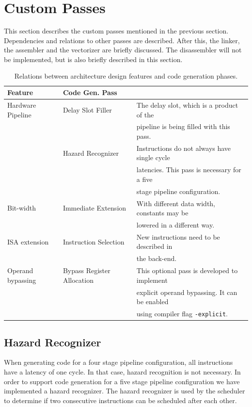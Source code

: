 \section{Custom Passes}
This section describes the custom passes mentioned in the previous section. Dependencies and relations to other passes are described. After this, the linker, the assembler and the vectorizer are briefly discussed. The disassembler will not be implemented, but is also briefly described in this section.

\begin{table}[t!]
\caption{Relations between architecture design features and code generation phases.}
\begin{center}
\begin{tabular}{@{}l l l@{}}
\toprule
\textbf{Feature} & \textbf{Code Gen. Pass} \\ \hline
Hardware Pipeline 	& Delay Slot Filler 	& The delay slot, which is a product of the\\
				&				& pipeline is being filled with this pass.\\
			 	& Hazard Recognizer & Instructions do not always have single cycle\\
				&				 & latencies. This pass is necessary for a five\\
				&				& stage pipeline configuration. \\
Bit-width 			& Immediate Extension & With different data width, constants may be\\
				&				    & lowered in a different way. \\
ISA extension		& Instruction Selection & New instructions need to be described in\\
				&					& the back-end. \\
Operand bypassing 	& Bypass Register Allocation & This optional pass is developed to implement\\
				&					& explicit operand bypassing. It can be enabled\\
				&					& using compiler flag \texttt{-explicit}. \\
\bottomrule
\end{tabular}
\end{center}
\label{table:rel_feature_pass}
\end{table}%

\subsection{Hazard Recognizer}\label{sec:hazard_recogn}
When generating code for a four stage pipeline configuration, all instructions have a latency of one cycle. In that case, hazard recognition is not necessary.
In order to support code generation for a five stage pipeline configuration we have implemented a hazard recognizer. The hazard recognizer is used by the scheduler to determine if two consecutive instructions can be scheduled after each other. 

